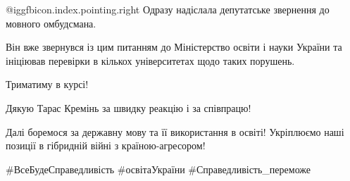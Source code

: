  @igg{fbicon.index.pointing.right} Одразу надіслала депутатське звернення до мовного омбудсмана.

Він вже звернувся із цим питанням до Міністерство освіти і науки України та
ініціював перевірки в кількох університетах щодо таких порушень.

Триматиму в курсі!

Дякую Тарас Кремінь за швидку реакцію і за співпрацю!

Далі боремося за державну мову та її використання в освіті! Укріплюємо наші
позиції в гібридній війні з країною-агресором!

\#ВсеБудеСправедливість \#освітаУкраїни \#Справедливість\_переможе

